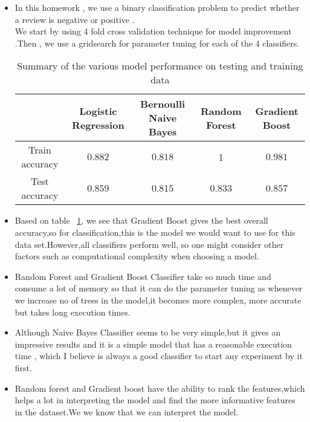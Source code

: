 \documentclass{article}
\begin{document}
\begin{itemize}
	\item In this homework , we use a binary classification problem to predict whether a review is negative or positive .\\
	 We start by using 4 fold cross validation technique for model improvement .Then , we use a gridsearch for parameter tuning for each of the 4 classifiers.
	 
\begin{table}[H]
	\centering
	\begin{tabular}{c c c c  c} 
		&Logistic Regression   & Bernoulli Naive Bayes & Random Forest & Gradient Boost \\
		\hline
		Train accuracy &  $0.882$ & $0.818$ & 1 & $0.981$  \\ 
		\hline
		Test accuracy & $0.859$ & $0.815$ & $0.833$ & $0.857$ \\ 
		\hline
	\end{tabular}
	\caption{{\small Summary of the various model performance on testing and training data }}
	\label{table:6}
\end{table}

	\item Based on table ~\ref{table:6}, we see that Gradient Boost gives the best overall accuracy,so for classification,this is the model we would want to use for this data set.However,all classifiers perform well, so one might consider other factors such as computational complexity when choosing a model. 
	
	\item Random Forest and Gradient Boost Classifier take so much time and consume a lot of memory so that it can do the parameter tuning as whenever we increase no of trees in the model,it becomes more complex, more accurate but takes long execution times.
	
	\item Although Naive Bayes Classifier seems to be very simple,but it gives an impressive results and it is a simple model that has a reasonable execution time , which I believe is always a good classifier to start any experiment by it first.
	
	\item Random forest and Gradient boost have the ability to rank the features,which helps a lot in interpreting the model and find the more informative features in the dataset.We we know that we can interpret the model.

\end{itemize}
\end{document}
